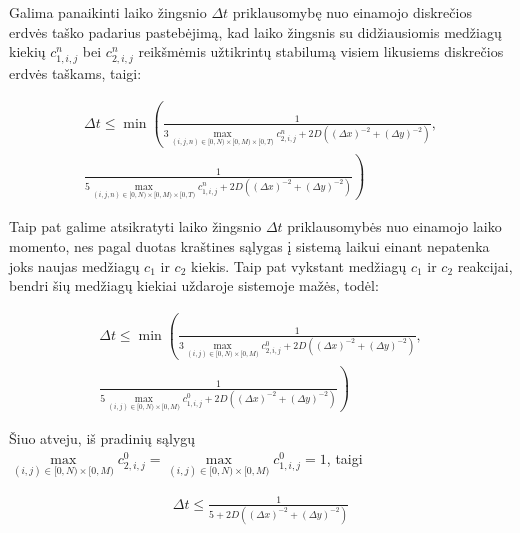 \newpage
Galima panaikinti laiko žingsnio $\Delta t$ priklausomybę nuo einamojo diskrečios erdvės taško padarius pastebėjimą,
kad laiko žingsnis su didžiausiomis medžiagų kiekių $c^n_{1,i,j}$ bei $c^n_{2,i,j}$ reikšmėmis užtikrintų stabilumą visiem
likusiems diskrečios erdvės taškams, taigi:

\begin{align*}
    \Delta t\leq\min\left(
    \frac{1}{3\max\limits_{(i,j,n)\in[0,N)\times[0,M)\times[0,T)}c^{n}_{2,i,j}
    +2D\left((\Delta x)^{-2}+(\Delta y)^{-2}\right)},\right.\\
    \left. \frac{1}{5\max\limits_{(i,j,n)\in[0,N)\times[0,M)\times[0,T)}c^{n}_{1,i,j}
    +2D\left((\Delta x)^{-2}+(\Delta y)^{-2}\right)}
    \right)
\end{align*}

Taip pat galime atsikratyti laiko žingsnio $\Delta t$ priklausomybės nuo einamojo laiko momento, nes
pagal duotas kraštines sąlygas į sistemą laikui einant nepatenka joks naujas medžiagų $c_1$ ir $c_2$ kiekis.
Taip pat vykstant medžiagų $c_1$ ir $c_2$ reakcijai, bendri šių medžiagų kiekiai uždaroje sistemoje mažės, todėl:

\begin{align*}
    \Delta t\leq\min\left(
        \frac{1}{3\max\limits_{(i,j)\in[0,N)\times[0,M)}c^{0}_{2,i,j}
        +2D\left((\Delta x)^{-2}+(\Delta y)^{-2}\right)},\right. \\
        \left. \frac{1}{5\max\limits_{(i,j)\in[0,N)\times[0,M)}c^{0}_{1,i,j}
        +2D\left((\Delta x)^{-2}+(\Delta y)^{-2}\right)}
    \right)
\end{align*}

Šiuo atveju, iš pradinių sąlygų $\max\limits_{(i,j)\in[0,N)\times[0,M)}c^{0}_{2,i,j}=\max\limits_{(i,j)\in[0,N)\times[0,M)}c^{0}_{1,i,j}=1$, taigi

\begin{align*}
    \Delta t\leq\frac{1}{5+2D\left((\Delta x)^{-2}+(\Delta y)^{-2}\right)}
\end{align*}